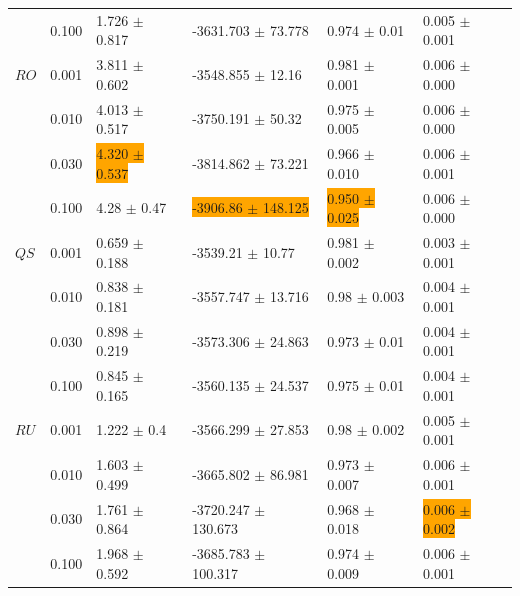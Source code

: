 \documentclass[shortabstract]{iithesis}
\begin{document}
\begin{table}[!ht]
\begin{tabular}{llllll}
        & 0.100 &  1.726 $\pm$ 0.817 &   -3631.703 $\pm$ 73.778 &   0.974 $\pm$ 0.01 &  0.005 $\pm$ 0.001 \\
$RO$ & 0.001 &  3.811 $\pm$ 0.602 &    -3548.855 $\pm$ 12.16 &  0.981 $\pm$ 0.001 &    0.006 $\pm$ 0.000 \\
        & 0.010 &  4.013 $\pm$ 0.517 &    -3750.191 $\pm$ 50.32 &  0.975 $\pm$ 0.005 &    0.006 $\pm$ 0.000 \\
        & 0.030 &   \colorbox{orange}{4.320 $\pm$ 0.537} &   -3814.862 $\pm$ 73.221 &   0.966 $\pm$ 0.010 &  0.006 $\pm$ 0.001 \\
        & 0.100 &    4.28 $\pm$ 0.47 &   \colorbox{orange}{-3906.86 $\pm$ 148.125} &  \colorbox{orange}{0.950 $\pm$ 0.025} &    0.006 $\pm$ 0.000 \\
$QS$ & 0.001 &  0.659 $\pm$ 0.188 &     -3539.21 $\pm$ 10.77 &  0.981 $\pm$ 0.002 &  0.003 $\pm$ 0.001 \\
        & 0.010 &  0.838 $\pm$ 0.181 &   -3557.747 $\pm$ 13.716 &   0.98 $\pm$ 0.003 &  0.004 $\pm$ 0.001 \\
        & 0.030 &  0.898 $\pm$ 0.219 &   -3573.306 $\pm$ 24.863 &   0.973 $\pm$ 0.01 &  0.004 $\pm$ 0.001 \\
        & 0.100 &  0.845 $\pm$ 0.165 &   -3560.135 $\pm$ 24.537 &   0.975 $\pm$ 0.01 &  0.004 $\pm$ 0.001 \\
$RU$ & 0.001 &    1.222 $\pm$ 0.4 &   -3566.299 $\pm$ 27.853 &   0.98 $\pm$ 0.002 &  0.005 $\pm$ 0.001 \\
        & 0.010 &  1.603 $\pm$ 0.499 &   -3665.802 $\pm$ 86.981 &  0.973 $\pm$ 0.007 &  0.006 $\pm$ 0.001 \\
        & 0.030 &  1.761 $\pm$ 0.864 &  -3720.247 $\pm$ 130.673 &  0.968 $\pm$ 0.018 &  \colorbox{orange}{0.006 $\pm$ 0.002} \\
        & 0.100 &  1.968 $\pm$ 0.592 &  -3685.783 $\pm$ 100.317 &  0.974 $\pm$ 0.009 &  {0.006 $\pm$ 0.001} \\
\hline
\end{tabular}
\label{tab:res_0_64}
\end{table}

\newpage
\end{document}
